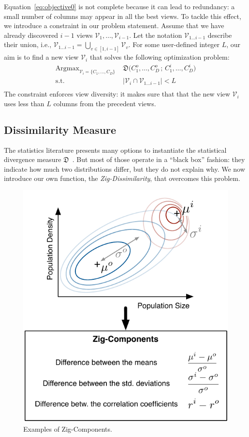 Equation~\ref{eq:objective0} is not complete because it can lead to
redundancy: a small number of columns may appear in all the best views. To
tackle this effect, we introduce a constraint in our problem statement.  Assume
that we have already discovered $i-1$ views $\mathcal{V}_1, \ldots,
\mathcal{V}_{i-1}$. Let the notation $\mathcal{V}_{1 \ldots i-1}$ describe
their union, i.e., $\mathcal{V}_{1 \ldots i-1} = \bigcup_{v \in [1,i-1]}
\mathcal{V}_v$. For some user-defined integer $L$, our aim is to find a new
view $\mathcal{V}_i$ that solves the following optimization problem:
\begin{equation}
    \label{eq:objective}
    \begin{aligned}
        \text{Argmax}_{\mathcal{V}_i =\{C_1, \ldots, C_D\}}\; 
        & \mathfrak{D}\big( C_1^o, \ldots, C_D^o \,;\, C_1^i, \ldots, C_D^i \big)\\
         \text{s.t.} 
         & \left|  \mathcal{V}_i \cap \mathcal{V}_{1\ldots i-1}\right|  <L\\ 
    \end{aligned}
\end{equation}
The constraint enforces view diversity: it makes sure that that the new view
$\mathcal{V}_i$ uses less than $L$ columns from the precedent views.

\subsection{Dissimilarity Measure}
The statistics literature presents many options to instantiate the statistical 
divergence measure $\mathfrak{D}$~\cite{wasserman2013all}. But most of those
operate in a ``black box'' fashion: they indicate how much two distributions
differ, but they do not explain why. We now introduce our own function, the
\emph{Zig-Dissimilarity}, that overcomes this problem.

\begin{figure}[t!]
    \centering
    \includegraphics[width=.7\columnwidth]{Images/Zig-Dissimilarity}
    \caption{Examples of Zig-Components.}
    \label{fig:zig-dissim}
\end{figure}

